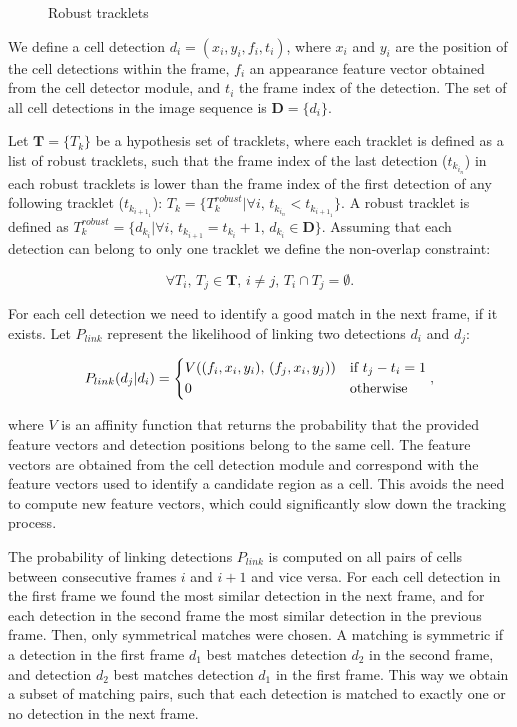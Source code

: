 		\begin{figure}[h]
			\centering
			\caption{Robust tracklets}
			\label{fig:robusttracklets}
		\end{figure}
		
		We define a cell detection $ d_i = (x_i, y_i, f_i, t_i) $, where $x_i$ and $y_i$ are the position of the cell detections within the frame, $ f_i $ an appearance feature vector obtained from the cell detector module, and $t_i$ the frame index of the detection. The set of all cell detections in the image sequence is $\textbf{D} = \{d_i\}$. 
		
		Let $ \textbf{T} = \{ T_k \} $ be a hypothesis set of tracklets, where each tracklet is defined as a list of robust tracklets, such that the frame index of the last detection ($ t_{k_{i_n}} $) in each robust tracklets is lower than the frame index of the first detection of any following tracklet ($  t_{k_{{i+1}_1}} $):	$T_k = \{T_k^{robust} | \forall i\text{, }  t_{k_{i_n}} < t_{k_{{i+1}_1}} \}$. A robust tracklet is defined as $ T_k^{robust} = \{ d_{k_i} | \forall i\text{, } t_{k_{i+1}} = t_{k_i}+1\text{, } d_{k_i} \in \textbf{D} \} $. Assuming that each detection can belong to only one tracklet we define the non-overlap constraint:
		
		\[
			\forall T_i \text{, } T_j \in \textbf{T} \text{, } i \neq j \text{, }  T_i \cap T_j = \emptyset \text{.}
		\]
		
		For each cell detection we need to identify a good match in the next frame, if it exists. Let $P_{link}$ represent the likelihood of linking two detections $d_i$ and $d_j$:
		
		\[
			P_{link}(d_j|d_i) = 
			\begin{dcases}
			   V((f_i, x_i, y_i)\text{, } (f_j, x_i, y_j)) & \text{if } t_j - t_i = 1 \\
			   0       & \text{otherwise}
			\end{dcases},
		\]
		
		\noindent where $V$ is an affinity function that returns the probability that the provided feature vectors and detection positions belong to the same cell. The feature vectors are obtained from the cell detection module and correspond with the feature vectors used to identify a candidate region as a cell. This avoids the need to compute new feature vectors, which could significantly slow down the tracking process.

		The probability of linking detections $P_{link}$ is computed on all pairs of cells between consecutive frames $i$ and $i+1$ and vice versa. For each cell detection in the first frame we found the most similar detection in the next frame, and for each detection in the second frame the most similar detection in the previous frame. Then, only symmetrical matches were chosen. A matching is symmetric if a detection in the first frame $d_1$ best matches detection $d_2$ in the second frame, and detection $d_2$ best matches detection $ d_1 $ in the first frame. This way we obtain a subset of matching pairs, such that each detection is matched to exactly one or no detection in the next frame.
		
